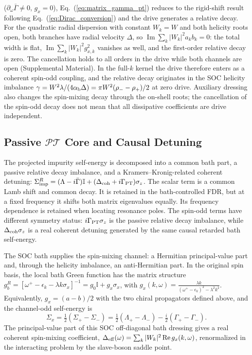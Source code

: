 \documentclass[%
  aps,physrev,onecolumn,10pt,amsmath,amssymb,superscriptaddress,longbibliography,floatfix
]{revtex4-2}
\newcommand{\PT}{\mathcal{PT}}
\newcommand{\Deff}{\Delta_{\rm eff}}     %
\newcommand{\Dcoh}{\Delta_{\rm coh}}          %
\begin{document}
($\partial_\omega\bar\Gamma\neq0$, $g_x=0$), Eq.~(\ref{eq:matrix_gamma_pt})
reduces to the rigid-shift result following Eq.~(\ref{eq:Dirac_conversion}) and the drive
generates a relative decay.  For the quadratic radial dispersion with constant $W_k=W$ and both
helicity roots open, both branches have radial velocity $\Delta$, so
$\operatorname{Im}\sum_k|W_k|^2a_kb_k=0$: the total width is flat,
$\operatorname{Im}\sum_k|W_k|^2g_{x,k}^2$ vanishes as well, and the
first-order relative decay is zero.  The cancellation holds to all orders in
the drive while both channels are open (Supplemental Material).  In the
full-$k$ kernel the drive therefore enters as a coherent spin-odd coupling,
and the relative decay originates in the SOC helicity imbalance
$\gamma=W^2\lambda/(4\alpha_{\rm b}\Delta)=\pi W^2(\rho_--\rho_+)/2$ at zero
drive.  Auxiliary dressing also changes the spin-mixing decay through the
on-shell roots; the cancellation of the spin-odd decay does not mean that
all dissipative coefficients are drive independent.

\subsection{Passive \texorpdfstring{$\PT$}{PT} Core and Causal Detuning}
\label{sec:PT_all}

The projected impurity self-energy is decomposed into a common bath part,
a passive relative decay imbalance, and a Kramers--Kronig-related coherent
detuning: $\Sigma_{\rm imp}^{R}=(\Lambda-i\bar\Gamma)\mathbb I+(\Dcoh+i\Gamma_{\rm PT})\sigma_z$.
The scalar term is a common Lamb shift and common decay.  It is retained in
the bath-controlled FDR, but at a fixed frequency it shifts both matrix eigenvalues equally.
Its frequency dependence is retained when locating resonance poles.
The spin-odd terms have different symmetry status:
$i\Gamma_{\rm PT}\sigma_z$ is the passive relative decay imbalance, while
$\Dcoh\sigma_z$ is a real coherent detuning generated by the same causal
retarded bath self-energy.

The SOC bath supplies the spin-mixing channel: a Hermitian principal-value
part and, through the helicity imbalance, an anti-Hermitian part.  In the original
spin basis, the local bath Green function has the matrix structure $g_b^R=[\omega^+-\epsilon_k-\lambda k\sigma_x]^{-1}=g_0\mathbb I+g_x\sigma_x$,
with $g_x(k,\omega)= \frac{\lambda k} {(\omega^+-\epsilon_k)^2-\lambda^2 k^2}$.
Equivalently, $g_x=(a-b)/2$ with the two chiral propagators defined above,
and the channel-odd self-energy is
\begin{equation}
\Sigma_x=\tfrac12(\Sigma_+-\Sigma_-)
=\tfrac12(\Lambda_+-\Lambda_-)-\tfrac{i}{2}(\Gamma_+-\Gamma_-).
\label{eq:complex_channel_odd_self_energy}
\end{equation}
The principal-value part of this SOC off-diagonal bath dressing gives a
real coherent spin-mixing coefficient, $\Deff(\omega)= \sum_k |W_k|^2\, {\rm Re}\, g_x(k,\omega)$,
renormalized in the interacting problem by the slave-boson saddle point.
\end{document}
